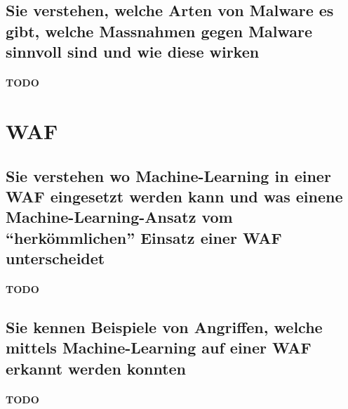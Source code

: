 \documentclass[10pt,a4paper]{article}
\begin{document}
\subsection*{Sie verstehen, welche Arten von Malware es gibt, welche Massnahmen gegen Malware sinnvoll sind und wie diese wirken}
\paragraph*{TODO}

\section{WAF}
\subsection*{Sie verstehen wo Machine-Learning in einer WAF eingesetzt werden kann und was einene Machine-Learning-Ansatz vom "`herkömmlichen"' Einsatz einer WAF unterscheidet}
\paragraph*{TODO}

\subsection*{Sie kennen Beispiele von Angriffen, welche mittels Machine-Learning auf einer WAF erkannt werden konnten}
\paragraph*{TODO}
\printindex
\listoffigures
\end{document}
